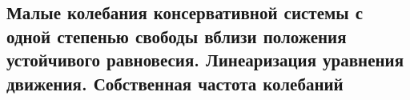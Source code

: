 

\subsection{Малые колебания консервативной системы с одной степенью свободы вблизи положения устойчивого равновесия. Линеаризация уравнения движения. Собственная частота колебаний}



